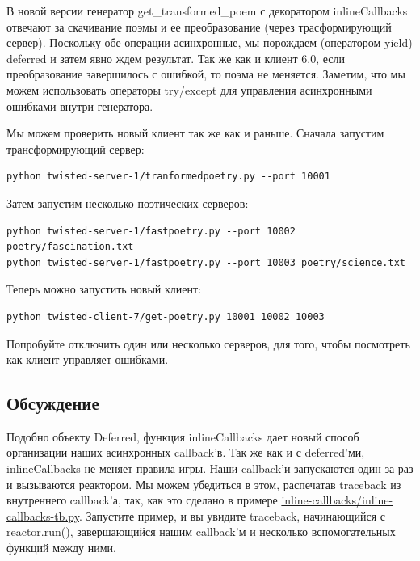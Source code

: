 В новой версии генератор get\_transformed\_poem с декоратором 
inlineCallbacks отвечают за скачивание поэмы и ее 
преобразование (через трасформирующий сервер). Поскольку 
обе операции асинхронные, мы порождаем (оператором yield) 
deferred и затем явно ждем результат. Так же как и клиент 6.0, 
если преобразование завершилось с ошибкой, то поэма не 
меняется. Заметим, что мы можем использовать операторы 
try/except для управления асинхронными ошибками внутри 
генератора.


Мы можем проверить новый клиент так же как и раньше. 
Сначала запустим трансформирующий сервер:

\begin{scriptsize}\begin{verbatim}
python twisted-server-1/tranformedpoetry.py --port 10001
\end{verbatim}\end{scriptsize}

Затем запустим несколько поэтических серверов:

\begin{scriptsize}\begin{verbatim}
python twisted-server-1/fastpoetry.py --port 10002 poetry/fascination.txt
python twisted-server-1/fastpoetry.py --port 10003 poetry/science.txt
\end{verbatim}\end{scriptsize}

Теперь можно запустить новый клиент:

\begin{scriptsize}\begin{verbatim}
python twisted-client-7/get-poetry.py 10001 10002 10003
\end{verbatim}\end{scriptsize}

Попробуйте отключить один или несколько серверов, для 
того, чтобы посмотреть как клиент управляет ошибками.


\subsection{Обсуждение}

Подобно объекту Deferred, функция inlineCallbacks дает 
новый способ организации наших асинхронных callback'в. 
Так же как и с deferred'ми, inlineCallbacks не меняет 
правила игры. Наши callback'и запускаются 
один за раз и вызываются реактором. Мы можем убедиться 
в этом, распечатав traceback из внутреннего callback'а, 
так, как это сделано в примере 
\href{http://github.com/jdavisp3/twisted-intro/blob/master/inline-callbacks/inline-callbacks-tb.py#L1}{inline-callbacks/inline-callbacks-tb.py}. Запустите пример, и вы увидите 
traceback, начинающийся с reactor.run(), завершающийся 
нашим callback'м и несколько вспомогательных функций 
между ними.


